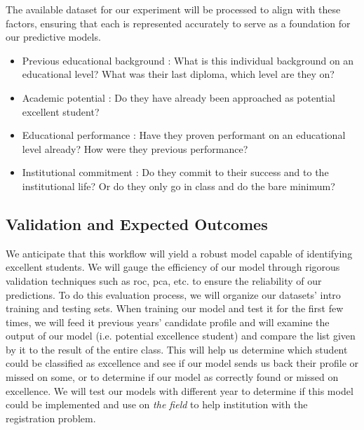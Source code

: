 \documentclass[../main.tex]{subfiles}
\begin{document}
The available dataset for our experiment will be processed to align with these factors, ensuring that each is represented accurately to serve as a foundation for our predictive models.
\begin{itemize}
    \item Previous educational background : What is this individual background on an educational level? What was their last diploma, which level are they on? 
    \item Academic potential : Do they have already been approached as potential excellent student?
    \item Educational performance : Have they proven performant on an educational level already? How were they previous performance?
    \item Institutional commitment : Do they commit to their success and to the institutional life? Or do they only go in class and do the bare minimum?
\end{itemize}

\subsection{Validation and Expected Outcomes}
\label{subsec:concimp_validexcpecoutcomes}
 We anticipate that this workflow will yield a robust model capable of identifying excellent students. We will gauge the efficiency of our model through rigorous validation techniques such as \acrfull{roc}, \acrfull{pca}, etc. to ensure the reliability of our predictions. 
To do this evaluation process, we will organize our datasets' intro training and testing sets. When training our model and test it for the first few times, we will feed it previous years' candidate profile and will examine the output of our model (i.e. potential excellence student) and compare the list given by it to the result of the entire class. This will help us determine which student could be classified as excellence and see if our model sends us back their profile or missed on some, or  to determine if our model as correctly found or missed on excellence.  
We will test our models with different year to determine if this model could be implemented and use on \textit{the field} to help institution with the registration problem.
\end{document}
